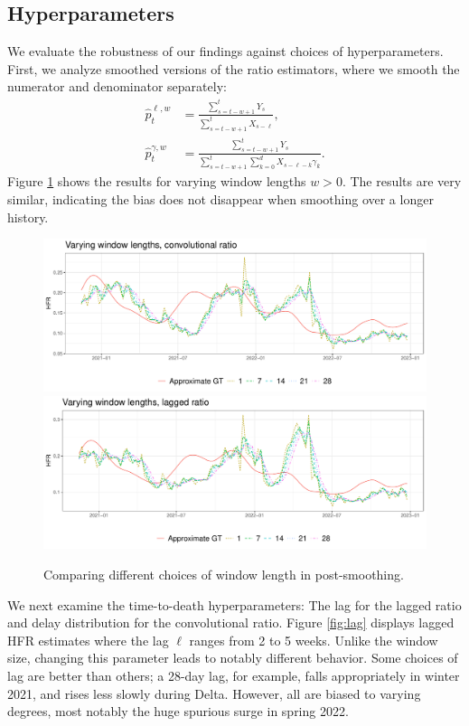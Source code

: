 \documentclass{article}
\renewcommand{\hat}{\widehat} %
\begin{document}
\subsection{Hyperparameters}

We evaluate the robustness of our findings against choices of hyperparameters.
First, we analyze smoothed versions of the ratio estimators, where we smooth the 
numerator and denominator separately:
\begin{align*}
\hat{p}_t^{\ell,w} &= \frac{\sum_{s=t-w+1}^t Y_s}
{\sum_{s=t-w+1}^t X_{s-\ell}}, \\ 
\hat{p}_t^{\gamma,w} &= \frac{\sum_{s=t-w+1}^t Y_s}
{\sum_{s=t-w+1}^t \sum_{k=0}^d X_{s-\ell-k}\gamma_k}.
\end{align*} 
Figure \ref{fig:window} shows the results for varying window lengths $w >
0$. The results are very similar, indicating the bias does not disappear when
smoothing over a longer history.  

\begin{figure}[h!]
\centering
\includegraphics[width=\linewidth]{Figures/Real/window_size_conv.pdf}
\includegraphics[width=\linewidth]{Figures/Real/window_size_lagg.pdf}
\caption{Comparing different choices of window length in post-smoothing.}
\label{fig:window}
\end{figure}

We next examine the time-to-death hyperparameters: The lag for the lagged ratio
and delay distribution for the convolutional ratio. Figure \ref{fig:lag}
displays lagged HFR estimates where the lag $\ell$ ranges from 2 to 5
weeks. Unlike the window size, changing this parameter leads to notably
different behavior. Some choices of lag are better than others; a 28-day lag,
for example, falls appropriately in winter 2021, and rises less slowly during
Delta. However, all are biased to varying degrees, most notably the huge
spurious surge in spring 2022.
\end{document}
